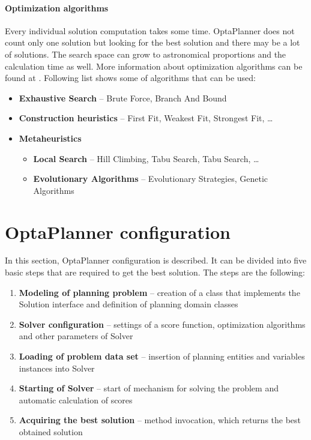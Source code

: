 \paragraph{Optimization algorithms}\label{optimalAlg}
Every individual solution computation takes some time. OptaPlanner does not count only one solution but looking for the best solution and there may be a lot of solutions. The search space can grow to astronomical proportions and the calculation time as well. More information about optimization algorithms can be found at \cite{OptaPlannerDoc}. Following list shows some of algorithms that can be used:
\begin{itemize}
\item \textbf{Exhaustive Search} -- Brute Force,  Branch And Bound
\item \textbf{Construction heuristics} --  First Fit, Weakest Fit,  Strongest Fit, \dots
\item \textbf{Metaheuristics}
\begin{itemize}
\item \textbf{Local Search} --  Hill Climbing, Tabu Search, Tabu Search, \dots
\item \textbf{Evolutionary Algorithms} -- Evolutionary Strategies, Genetic Algorithms
\end{itemize}
\end{itemize}

\section{OptaPlanner configuration}\label{plannerConf}
In this section, OptaPlanner configuration is described. It can be divided into five basic steps that are required to get the best solution. The steps are the following:

\begin{enumerate}
\item \textbf{Modeling of planning problem} -- creation of a class that implements the Solution interface and definition of planning domain classes
\item \textbf{Solver configuration} -- settings of a score function, optimization algorithms and other parameters of Solver
\item \textbf{Loading of problem data set} -- insertion of planning entities and variables instances into Solver
\item \textbf{Starting of Solver} -- start of mechanism for solving the problem and automatic calculation of scores
\item \textbf{Acquiring the best solution} -- method invocation, which returns the best obtained solution
\end{enumerate}

